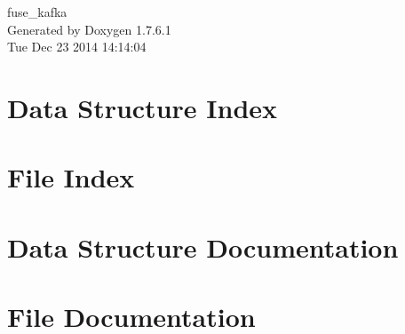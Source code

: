 \documentclass[a4paper]{book}
\begin{document}
\hypersetup{pageanchor=false,citecolor=blue}
\begin{titlepage}
\vspace*{7cm}
\begin{center}
{\Large fuse\-\_\-kafka }\\
\vspace*{1cm}
{\large \-Generated by Doxygen 1.7.6.1}\\
\vspace*{0.5cm}
{\small Tue Dec 23 2014 14:14:04}\\
\end{center}
\end{titlepage}
\clearemptydoublepage
{}
\tableofcontents
\clearemptydoublepage
{}
\hypersetup{pageanchor=true,citecolor=blue}
\chapter{\-Data \-Structure \-Index}

\chapter{\-File \-Index}

\chapter{\-Data \-Structure \-Documentation}
















\chapter{\-File \-Documentation}








\printindex
\end{document}
